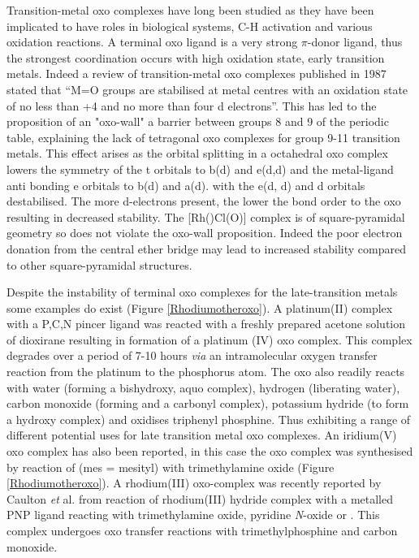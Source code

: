 Transition-metal oxo complexes have long been studied as they have been implicated to have roles in  biological systems,\cite{Lipscomb1994, Merkx2001, Tinberg2011, Montellano2010} C-H activation\cite{Balcells2010, Borovik2011} and various oxidation reactions\cite{Holm1987, Atlay1983, Poverenov2008}.  A terminal oxo ligand is a very strong $\pi$-donor ligand, thus the strongest coordination occurs with high oxidation state, early transition metals\cite{Anderson2004}.  Indeed a review of transition-metal oxo complexes published in 1987 stated that ``M=O groups are stabilised at metal centres with an oxidation state of no less than +4 and no more than four d electrons''.\cite{Holm1987}  This has led to the proposition of an "oxo-wall" a barrier between groups 8 and 9 of the periodic table, explaining the lack of tetragonal oxo complexes for group 9-11 transition metals.\cite{Winkler2011}  This effect arises as the orbital splitting in a octahedral oxo complex lowers the symmetry of the t orbitals to b(d) and e(d,d) and the metal-ligand anti bonding e orbitals to b(d) and a(d).  with the e(d, d) and d orbitals destabilised.\cite{Betley2008}  The more d-electrons present, the lower the bond order to the oxo resulting in decreased stability.  The [Rh(\tBuxantphos)Cl(O)] complex is of square-pyramidal geometry so does not violate the oxo-wall proposition.  Indeed the poor electron donation from the central ether bridge may lead to increased stability compared to other square-pyramidal structures.  

Despite the instability of terminal oxo complexes for the late-transition metals some examples do exist (Figure \ref{Rhodiumotheroxo}).  A platinum(II) complex with a P,C,N pincer ligand was reacted with a freshly prepared acetone solution of dioxirane resulting in formation of a platinum (IV) oxo complex.\cite{Poverenov2008}  This complex degrades over a period of 7-10 hours \emph{via} an intramolecular oxygen transfer reaction from the platinum to the phosphorus atom.  The oxo also readily reacts with water (forming a bishydroxy, aquo complex), hydrogen (liberating water), carbon monoxide (forming  and a carbonyl complex), potassium hydride (to form a hydroxy complex) and oxidises triphenyl phosphine.  Thus exhibiting a range of different potential uses for late transition metal oxo complexes.  An iridium(V) oxo complex has also been reported, in this case the oxo complex was synthesised by reaction of \ce{[Ir(mes)3]} (mes = mesityl) with trimethylamine oxide (Figure \ref{Rhodiumotheroxo}).\cite{Motherwell1993}  A rhodium(III) oxo-complex was recently reported by Caulton \emph{et} al. from reaction of rhodium(III) hydride complex with a metalled PNP ligand reacting with trimethylamine oxide, pyridine \emph{N}-oxide or .\cite{Verat2008, Tsvetkov2013}  This complex undergoes oxo transfer reactions with trimethylphosphine and carbon monoxide.

